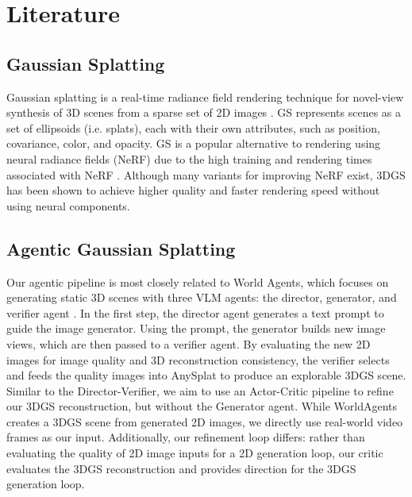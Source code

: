 \section{Literature}
\label{sec:literature}

\subsection{Gaussian Splatting}

\noindent Gaussian splatting is a real-time radiance field rendering technique for novel-view synthesis of 3D scenes from a sparse set of 2D images \cite{kerbl20233dgaussiansplattingrealtime}. GS represents scenes as a set of ellipsoids (i.e. splats), each with their own attributes, such as position, covariance, color, and opacity. GS is a popular alternative to rendering using neural radiance fields (NeRF) due to the high training and rendering times associated with NeRF \cite{mildenhall2020nerf}. Although many variants for improving NeRF exist, 3DGS has been shown to achieve higher quality and faster rendering speed without using neural components.\\

\subsection{Agentic Gaussian Splatting}

\noindent Our agentic pipeline is most closely related to World Agents, which focuses on generating static 3D scenes with three VLM agents: the director, generator, and verifier agent \cite{erkoc2026worldagents}. In the first step, the director agent generates a text prompt to guide the image generator. Using the prompt, the generator builds new image views, which are then passed to a verifier agent. By evaluating the new 2D images for image quality and 3D reconstruction consistency, the verifier selects and feeds the quality images into AnySplat to produce an explorable 3DGS scene. Similar to the Director-Verifier, we aim to use an Actor-Critic pipeline to refine our 3DGS reconstruction, but without the Generator agent. While WorldAgents creates a 3DGS scene from generated 2D images, we directly use real-world video frames as our input. Additionally, our refinement loop differs: rather than evaluating the quality of 2D image inputs for a 2D generation loop, our critic evaluates the 3DGS reconstruction and provides direction for the 3DGS generation loop.